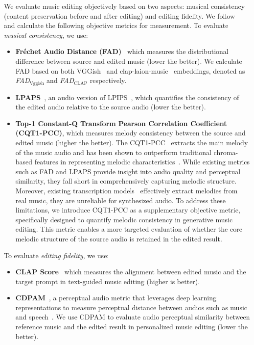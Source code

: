 We evaluate music editing objectively based on two aspects: musical consistency (content preservation before and after editing) and editing fidelity. We follow~\citet{manor2024zero} and calculate the following objective metrics for measurement. 
To evaluate \textit{musical consistency}, we use:
\begin{itemize}
    \item \textbf{Fréchet Audio Distance (FAD)}~\cite{kilgour2018fr} which measures the distributional difference between source and edited music (lower the better). We calculate FAD based on both VGGish~\cite{hershey2017cnn} and clap-laion-music~\cite{wu2023large} embeddings, denoted as \textit{FAD$_{\text{Vggish}}$} and \textit{FAD$_\text{CLAP}$} respectively.
    \item \textbf{LPAPS}~\cite{iashin2021taming}, an audio version of LPIPS~\cite{zhang2018unreasonable}, which quantifies the consistency of the edited audio relative to the source audio (lower the better).
    \item \textbf{Top-1 Constant-Q Transform Pearson Correlation Coefficient (CQT1-PCC)}, which measures melody consistency between the source and edited music (higher the better). The CQT1-PCC~\cite{brown1991calculation} extracts the main melody of the music audio and has been shown to outperform traditional chroma-based features in representing melodic characteristics~\cite{hou2024editing}. While existing metrics such as FAD and LPAPS provide insight into audio quality and perceptual similarity, they fall short in comprehensively capturing melodic structure. Moreover, existing transcription models~\cite{cwitkowitz2024timbre,bittner2022lightweight,gardner2022mt,chang2024yourmt3+,mancusi2025latent} effectively extract melodies from real music, they are unreliable for synthesized audio. To address these limitations, we introduce CQT1-PCC as a supplementary objective metric, specifically designed to quantify melodic consistency in generative music editing. This metric enables a more targeted evaluation of whether the core melodic structure of the source audio is retained in the edited result. 
\end{itemize}

To evaluate \textit{editing fidelity}, we use:

\begin{itemize}
    \item \textbf{CLAP Score}~\cite{wu2023large} which
measures the alignment between edited music and the target prompt in text-guided music editing (higher is better).
    \item \textbf{CDPAM}~\cite{manocha2021cdpam}, a perceptual audio metric that leverages deep learning representations to measure perceptual distance between audios such as music and speech~\cite{jacobellis2024machine,hai2024dpm,gui2024adapting}. We use CDPAM to evaluate audio perceptual similarity between reference music and the edited result in personalized music editing (lower the better).
\end{itemize}

